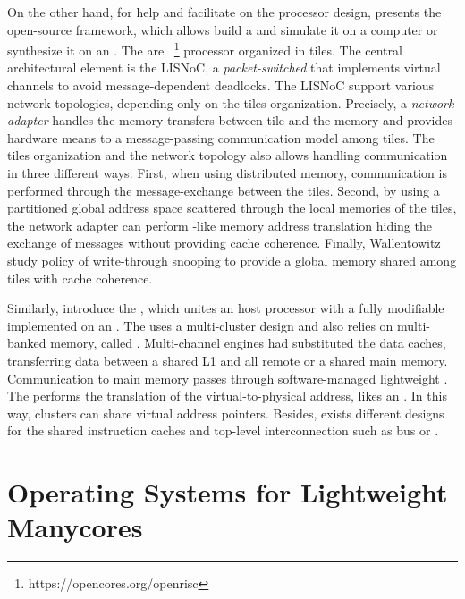 	On the other hand, for help and facilitate on the \manycore processor design,
	 presents the open-source \optimsoc
	framework, which allows build a
		\manycore \soc {}
	and simulate it on a computer or
	synthesize it on an \fpga.
	The \pe are \openrisc~\footnote{https://opencores.org/openrisc}
	processor organized in tiles.
	The central architectural element is the LISNoC, a \textit{packet-switched \noc}
	that implements virtual channels to avoid message-dependent deadlocks.
	The LISNoC support various network topologies, depending only on the tiles organization.
	Precisely, a \textit{network adapter} handles the memory transfers between
	tile and the memory and provides hardware means to a message-passing communication
	model among tiles.
	The tiles organization and the network topology also allows handling communication
	in three different ways.
	First, when using distributed memory, communication is performed through the
	message-exchange between the tiles.
	Second, by using a partitioned global address space scattered through the
	local memories of the tiles, the network adapter can perform \mpu-like memory
	address translation hiding the exchange of messages without providing cache coherence.
	Finally, Wallentowitz \etal study policy of write-through snooping to provide
	a global memory shared among tiles with cache coherence.

	Similarly,  introduce the \hero, which unites an \arm
	host processor with a fully modifiable \riscv \manycore implemented on an \fpga.
	The \pmca uses a multi-cluster design and also relies on multi-banked memory, called \spm.
	Multi-channel \dma engines had substituted the data caches, transferring data between
	a shared L1 \spm and all remote \spms or a shared main memory.
	Communication to main memory passes through software-managed lightweight \rab.
	The \rab performs the translation of the virtual-to-physical address, likes an \mmu.
	In this way, clusters can share virtual address pointers.
	Besides, exists different designs for the shared instruction caches and
	top-level interconnection such as bus or \noc.

\section{Operating Systems for Lightweight Manycores}
\label{sec.works.os}

